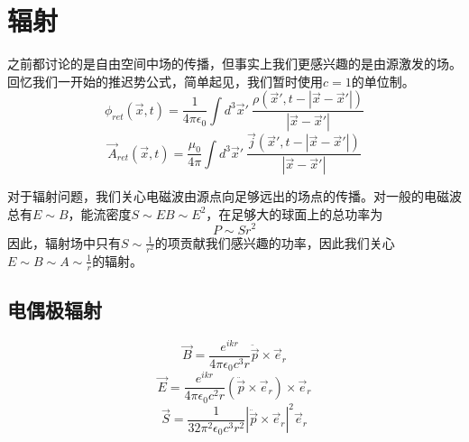 \documentclass[a4paper,11pt]{ctexbook}
\newcommand{\beq}{\begin{equation}}
\newcommand{\eeq}{\end{equation}}
\newcommand{\epv}{\epsilon_0}
\begin{document}
\section{辐射}
之前都讨论的是自由空间中场的传播，但事实上我们更感兴趣的是由源激发的场。回忆我们一开始的推迟势公式，简单起见，我们暂时使用$c=1$的单位制。
\beq
\phi_{ret}( \vec x, t) = \frac{1}{4\pi \epv}\int d^3 \vec{x}'\ \frac{\rho(\vec x', t - |\vec x - \vec{x}'|)}{|\vec x - \vec{x}'|}
\eeq
\beq
\vec A_{ret}( \vec x, t) = \frac{\mu_0}{4\pi}\int d^3 \vec{x}'\ \frac{\vec j(\vec x', t - |\vec x - \vec{x}'|)}{|\vec x - \vec{x}'|}
\eeq
\par
对于辐射问题，我们关心电磁波由源点向足够远出的场点的传播。对一般的电磁波总有$E \sim B$，能流密度$S \sim EB \sim E^2$，在足够大的球面上的总功率为
\beq
P \sim Sr^2
\eeq
因此，辐射场中只有$S \sim \frac{1}{r^2}$的项贡献我们感兴趣的功率，因此我们关心$E \sim B \sim A \sim \frac{1}{r}$的辐射。

\subsection{电偶极辐射}
\beq
\vec B = \frac{e^{ikr}}{4\pi \epv c^3 r} \ddot{\vec{p}} \times \vec e_r
\eeq
\beq
\vec E = \frac{e^{ikr}}{4\pi \epv c^2 r} (\ddot{\vec{p}} \times \vec e_r)\times \vec e_r
\eeq
\beq
\vec S = \frac{1}{32\pi^2 \epv c^3 r^2} |\ddot{\vec p} \times \vec e_r|^2 \vec e_r
\eeq
\end{document}
